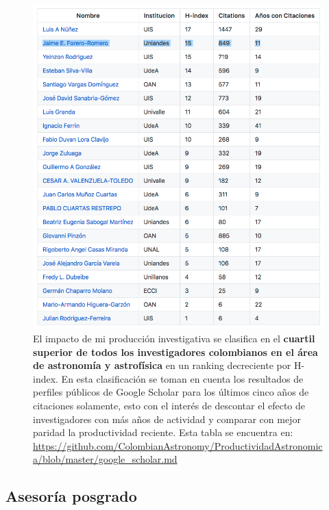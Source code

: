 \documentclass{article}
\begin{document}
\newpage

\begin{figure}[!h]
\begin{center}
\includegraphics[scale=0.5]{scholar_astronomia.png}
\caption{
El impacto de mi producci\'on investigativa se clasifica en el {\bf cuartil
  superior de todos los investigadores colombianos en el \'area de
  astronom\'ia y astrof\'isica} en 
  un ranking decreciente por H-index. 
  En esta clasificaci\'on se toman en cuenta los resultados de
  perfiles p\'ublicos de Google Scholar
  para los \'ultimos cinco a\~nos de citaciones solamente, esto con el
  inter\'es de descontar el efecto de investigadores con m\'as a\~nos de
  actividad y comparar con mejor paridad la productividad
  reciente. 
Esta tabla se encuentra en: 
\url{https://github.com/ColombianAstronomy/ProductividadAstronomica/blob/master/google_scholar.md}
\label{table:astro}}
\end{center}
\end{figure}

\newpage

\subsection{Asesor\'ia posgrado}
\end{document}
